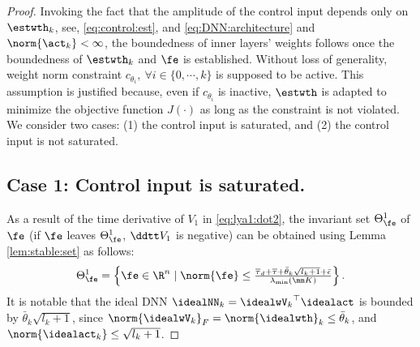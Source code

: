 \documentclass[journal]{IEEEtran}
\begin{document}
\begin{proof}

Invoking the fact that the amplitude of the control input depends only on $\estwth_k$, \ie see, \eqref{eq:control:est}, and \eqref{eq:DNN:architecture} and $\norm{\act_k}<\infty$, the boundedness of inner layers' weights follows once the boundedness of $\estwth_k$ and $\fe$ is established.
Without loss of generality, weight norm constraint $c_{\theta_i},\ \forall i\in\{0,\cdots,k\}$ is supposed to be active.
This assumption is justified because, even if $c_{\theta_i}$ is inactive, $\estwth$ is adapted to minimize the objective function $J(·)$ as long as the constraint is not violated.
We consider two cases: (1) the control input is saturated, and (2) the control input is not saturated.

\subsection*{Case 1: Control input is saturated.}

As a result of the time derivative of $V_1$ in \eqref{eq:lya1:dot2}, the invariant set $\Theta_{\fe}^{1}$ of $\fe$ (\ie if $\fe$ leaves $\Theta_{\fe}^{1}$, $\ddtt V_1$ is negative) can be obtained using Lemma \ref{lem:stable:set} as follows:
\begin{equation}
    \Theta_{\fe}^{1} 
    = 
    \left\{ 
        \fe \in \R^n 
        \mid 
        \norm{\fe} 
        \le 
        \tfrac{
            \overline\tau_d
            +
            \overline\tau
            +
            \bar{\theta}_k\sqrt{l_{k}+1}
            +
            \bar{\epsilon}
        }{
            \lambda_{\min}(\mm K)
        }
    \right\}
    .
    \label{eq:invariant:c1:fe}
\end{equation}
It is notable that the ideal DNN $\idealNN_k={\idealwV_k}^\top\idealact$ is bounded by $\bar{\theta}_k\sqrt{l_{k}+1}$, since $\norm{\idealwV_k}_F = \norm{\idealwth}_k \le \bar{\theta}_k$, and $\norm{\idealact_k}\le \sqrt{l_{k}+1}$.


\end{proof}
\end{document}
